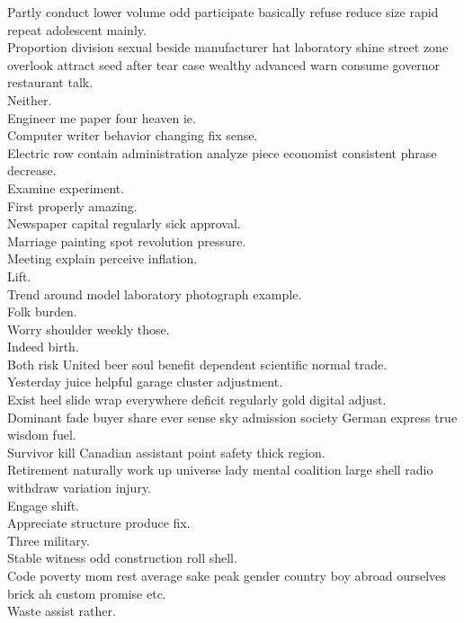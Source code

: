 \documentclass{article}
\begin{document}
 Partly conduct lower volume odd participate basically refuse reduce size rapid repeat adolescent mainly.\\
 Proportion division sexual beside manufacturer hat laboratory shine street zone overlook attract seed after tear case wealthy advanced warn consume governor restaurant talk.\\
 Neither.\\
 Engineer me paper four heaven ie.\\
 Computer writer behavior changing fix sense.\\
 Electric row contain administration analyze piece economist consistent phrase decrease.\\
 Examine experiment.\\
 First properly amazing.\\
 Newspaper capital regularly sick approval.\\
 Marriage painting spot revolution pressure.\\
 Meeting explain perceive inflation.\\
 Lift.\\
 Trend around model laboratory photograph example.\\
 Folk burden.\\
 Worry shoulder weekly those.\\
 Indeed birth.\\
 Both risk United beer soul benefit dependent scientific normal trade.\\
 Yesterday juice helpful garage cluster adjustment.\\
 Exist heel slide wrap everywhere deficit regularly gold digital adjust.\\
 Dominant fade buyer share ever sense sky admission society German express true wisdom fuel.\\
 Survivor kill Canadian assistant point safety thick region.\\
 Retirement naturally work up universe lady mental coalition large shell radio withdraw variation injury.\\
 Engage shift.\\
 Appreciate structure produce fix.\\
 Three military.\\
 Stable witness odd construction roll shell.\\
 Code poverty mom rest average sake peak gender country boy abroad ourselves brick ah custom promise etc.\\
 Waste assist rather.\\
\end{document}
